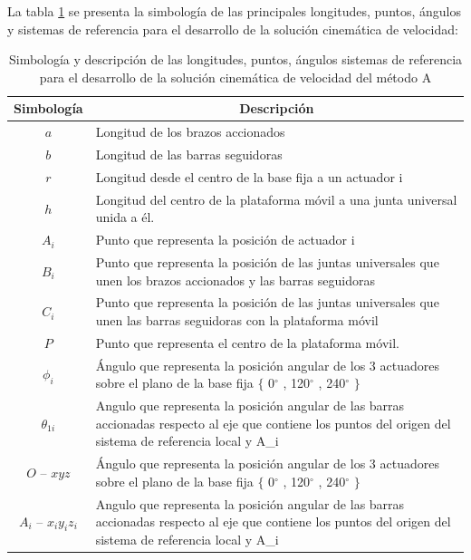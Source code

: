             \newpage


      La tabla \ref{tab:cap4_tabla_6} se presenta la simbología de las principales longitudes, puntos, ángulos y sistemas de referencia   para el desarrollo de la solución cinemática de velocidad:
 
        \begingroup
            \renewcommand{\arraystretch}{2.0}
            \begin{table}[H]
            \centering
            \begin{tabular}{c m{12cm}}
               \hline
               \textbf{Simbología}  & \multicolumn{1}{c}{\textbf{Descripción}}  \\
               \hline           \hline            
             $a$ & Longitud de los brazos accionados \\
            \hline
             $b$ & Longitud de las barras seguidoras \\
            \hline
             $r$ & Longitud desde el centro de la base fija a un actuador i \\
            \hline
             $h$ & Longitud del centro de la plataforma móvil a una junta universal unida a él.\\
            \hline
             $A_{i}$ & Punto que representa la posición de actuador i \\
            \hline
             $ B_{i}$ & Punto que representa la posición de las juntas universales que unen los brazos accionados y las barras seguidoras \\
            \hline
             $C_{i}$ & Punto que representa la posición de las juntas universales que unen las barras seguidoras con la plataforma móvil \\
            \hline
             $P$ & Punto que representa el centro de la plataforma móvil.\\
            \hline
             $\phi _{i}$ & Ángulo que representa la posición angular de los 3 actuadores sobre el plano de la base fija $ \{ $ 0$ ^{\circ} $ , 120$ ^{\circ} $ , 240$ ^{\circ} $ $ \} $ \\
            \hline
             $ \theta _{1i}$ & Angulo que representa la posición angular de las barras accionadas respecto al eje que contiene los puntos del origen del sistema de referencia local y A_{i}  \\
            \hline
             $O$ – $xyz$ & Ángulo que representa la posición angular de los 3 actuadores sobre el plano de la base fija $ \{ $ 0$ ^{\circ} $ , 120$ ^{\circ} $ , 240$ ^{\circ} $ $ \} $ \\
            \hline
             $  A_{i}$ – $x_{i}y_{i}z_{i}$ & Angulo que representa la posición angular de las barras accionadas respecto al eje que contiene los puntos del origen del sistema de referencia local y A_{i}  \\
            \hline
            \end{tabular}
            \caption{Simbología y descripción de las longitudes, puntos, ángulos sistemas de referencia para el desarrollo de la solución cinemática de velocidad del método A}
           \label{tab:cap4_tabla_6}
        \end{table}
        \endgroup        
        
